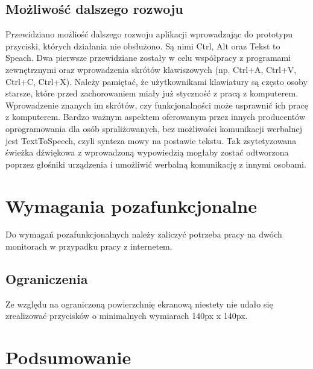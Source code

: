 \documentclass[twoside,a4paper]{book}
\begin{document}
\subsection{Możliwość dalszego rozwoju}
Przewidziano możliość dalszego rozwoju aplikacji wprowadzając do prototypu przyciski, których działania nie obsłużono. Są nimi Ctrl, Alt oraz Tekst to Speach. Dwa pierwsze przewidziane zostały w celu współpracy z programami zewnętrznymi oraz wprowadzenia  skrótów klawiszowych (np. Ctrl+A, Ctrl+V, Ctrl+C, Ctrl+X). Należy pamiętać, że użytkownikami klawiatury są często osoby starsze, które przed zachorowaniem miały już styczność z pracą z komputerem. Wprowadzenie znanych im skrótów, czy funkcjonalności może usprawnić ich pracę z komputerem. Bardzo ważnym aspektem oferowanym przez innych producentów oprogramowania dla osób spraliżowanych, bez możliwości komunikacji werbalnej jest TextToSpeech, czyli synteza mowy na postawie tekstu. Tak zsytetyzowana świeżka dźwiękowa z wprowadzoną wypowiedzią mogłaby zostać odtworzona poprzez głośniki urządzenia i umożliwić werbalną komunikację z innymi osobami.
\section{Wymagania pozafunkcjonalne}
Do wymagań pozafunkcjonalnych należy zaliczyć potrzeba pracy na dwóch monitorach w przypadku pracy z internetem.
\subsection{Ograniczenia}
Ze względu na ograniczoną powierzchnię ekranową niestety nie udało się zrealizować przycisków o minimalnych wymiarach 140px x 140px. 

\section{Podsumowanie}
\end{document}
